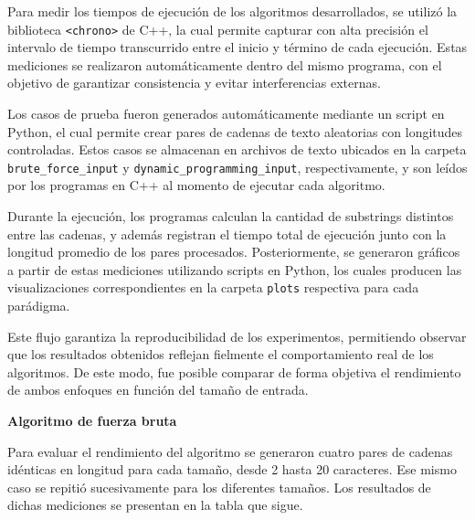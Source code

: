 Para medir los tiempos de ejecución de los algoritmos desarrollados, se utilizó la biblioteca \texttt{<chrono>} de C++, la cual permite capturar con alta precisión el intervalo de tiempo transcurrido entre el inicio y término de cada ejecución. Estas mediciones se realizaron automáticamente dentro del mismo programa, con el objetivo de garantizar consistencia y evitar interferencias externas.

\vspace{0.5 cm}

Los casos de prueba fueron generados automáticamente mediante un script en Python, el cual permite crear pares de cadenas de texto aleatorias con longitudes controladas. Estos casos se almacenan en archivos de texto ubicados en la carpeta \texttt{brute\_force\_input} y \texttt{dynamic\_programming\_input}, respectivamente, y son leídos por los programas en C++ al momento de ejecutar cada algoritmo.

\vspace{0.5 cm}

Durante la ejecución, los programas calculan la cantidad de substrings distintos entre las cadenas, y además registran el tiempo total de ejecución junto con la longitud promedio de los pares procesados. Posteriormente, se generaron gráficos a partir de estas mediciones utilizando scripts en Python, los cuales producen las visualizaciones correspondientes en la carpeta \texttt{plots} respectiva para cada parádigma.

\vspace{0.5 cm}

Este flujo garantiza la reproducibilidad de los experimentos, permitiendo observar que los resultados obtenidos reflejan fielmente el comportamiento real de los algoritmos. De este modo, fue posible comparar de forma objetiva el rendimiento de ambos enfoques en función del tamaño de entrada.

\vspace{0.5 cm}

\textbf{Algoritmo de fuerza bruta}

Para evaluar el rendimiento del algoritmo se generaron cuatro pares de cadenas idénticas en longitud para cada tamaño, desde 2 hasta 20 caracteres. Ese mismo caso se repitió sucesivamente para los diferentes tamaños. Los resultados de dichas mediciones se presentan en la tabla que sigue.

